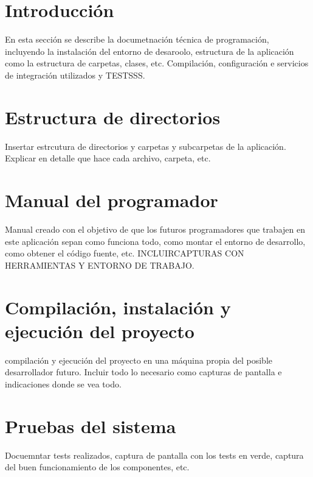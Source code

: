 
\section{Introducción}
En esta sección se describe la documetnación técnica de programación, incluyendo la instalación del entorno de desaroolo, estructura de la aplicación como la estructura de carpetas, clases, etc. Compilación, configuración e servicios de integración utilizados y TESTSSS.

\section{Estructura de directorios}

Insertar estrcutura de directorios y carpetas y subcarpetas de la aplicación. Explicar en detalle que hace cada archivo, carpeta, etc.

\section{Manual del programador}

Manual creado con el objetivo de que los futuros programadores que trabajen en este aplicación sepan como funciona todo, como montar el entorno de desarrollo, como obtener el código fuente, etc.
INCLUIRCAPTURAS CON HERRAMIENTAS Y ENTORNO DE TRABAJO.

\section{Compilación, instalación y ejecución del proyecto}

compilación y ejecución del proyecto en una máquina propia del posible desarrollador futuro. Incluir todo lo necesario como capturas de pantalla e indicaciones donde se vea todo.

\section{Pruebas del sistema}

Docuemntar tests realizados, captura de pantalla con los tests en verde, captura del buen funcionamiento de los componentes, etc.